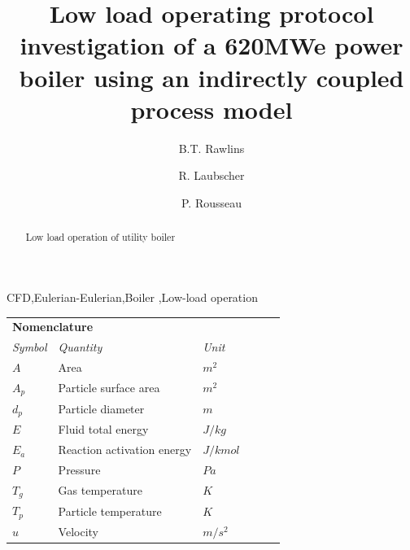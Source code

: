 \documentclass[review]{elsarticle}
\begin{document}
\begin{frontmatter}

\title{Low load operating protocol investigation of a 620MWe power boiler using an indirectly coupled process model}

\author{B.T. Rawlins}
\author{R. Laubscher}
\author{P. Rousseau}
\address{Department of Mechanical Engineering, Applied Thermal-Fluid Process Modeling Research Unit, University of Cape Town, Library Rd, Rondebosch, Cape Town, 7701, South Africa}

\begin{abstract}

Low load operation of utility boiler

\end{abstract}

\begin{keyword}
CFD\sep Eulerian-Eulerian\sep Boiler \sep Low-load operation
\end{keyword}

\end{frontmatter}

\linenumbers

\begin{center}
\begin{tabular}{|p{}p{}p{}p{}p{}p{}|} 
 \hline
\multicolumn{3}{|l}{\textbf{Nomenclature}} & &  &\\
\textit{Symbol} & \textit{Quantity} & \textit{Unit} & & &\\
$A$ &  Area & $m^2$ & & &\\
$A_p$ & Particle surface area & $m^2$& & & \\
$d_p$&Particle diameter & $m$ & & & \\
$E$& Fluid total energy&$J/kg$ & & & \\
$E_a$& Reaction activation energy&$J/kmol$ & & & \\
$P$& Pressure & $Pa$ & & & \\
$T_g$& Gas temperature& $K$ & & & \\
$T_p$&Particle temperature & $K$& & & \\
$u$& Velocity &$m/s^2$ & & &\\
\hline
\end{tabular}
\end{center}
\end{document}
